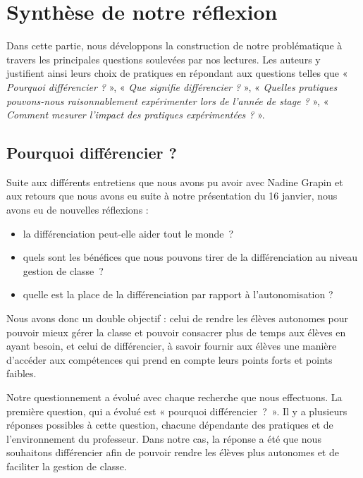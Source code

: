 \section{Synthèse de notre réflexion}
Dans cette partie, nous développons la construction de notre problématique à travers les principales questions soulevées par nos lectures.
Les auteurs y justifient ainsi leurs choix de pratiques en répondant aux questions telles que « \textit{Pourquoi différencier ?} », « \textit{Que signifie différencier ?} », « \textit{Quelles pratiques pouvons-nous raisonnablement expérimenter lors de l'année de stage ?} », « \textit{Comment mesurer l'impact des pratiques expérimentées ?} ».

\subsection{Pourquoi différencier ?}


Suite aux différents entretiens que nous avons pu avoir avec Nadine Grapin et aux retours que nous avons eu suite à notre présentation du 16 janvier, nous avons eu de nouvelles réflexions :
\begin{itemize}
    \item la différenciation peut-elle aider tout le monde ?
    \item quels sont les bénéfices que nous pouvons tirer de la différenciation au niveau gestion de classe ?
    \item quelle est la place de la différenciation par rapport à l’autonomisation ?
\end{itemize}

 Nous avons donc un double objectif : celui de rendre les élèves autonomes pour pouvoir mieux gérer la classe et pouvoir consacrer plus de temps aux élèves en ayant besoin, et celui de différencier, à savoir fournir aux élèves une manière d’accéder aux compétences qui prend en compte leurs points forts et points faibles.

Notre questionnement a évolué avec chaque recherche que nous effectuons. La première question, qui a évolué est « pourquoi différencier ? ». Il y a plusieurs réponses possibles à cette question, chacune dépendante des pratiques et de l’environnement du professeur. Dans notre cas, la réponse a été que nous souhaitons différencier afin de pouvoir rendre les élèves plus autonomes et de faciliter la gestion de classe.

